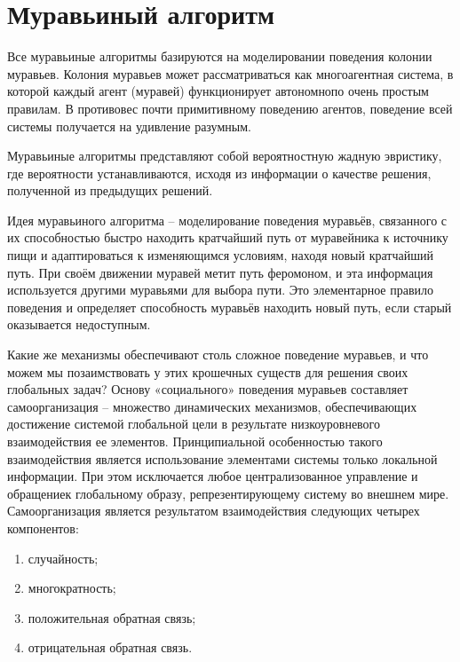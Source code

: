     \section{Муравьиный алгоритм}
        Все муравьиные алгоритмы базируются на моделировании поведения колонии муравьев.
        Колония муравьев может рассматриваться как многоагентная система,
        в которой каждый агент (муравей) функционирует автономнопо очень простым правилам.
        В противовес почти примитивному поведению агентов, 
        поведение всей системы получается на удивление разумным.
            
        Муравьиные алгоритмы представляют собой вероятностную жадную эвристику,
        где вероятности устанавливаются, 
        исходя из информации о качестве решения,
        полученной из предыдущих решений.
        
        Идея муравьиного алгоритма -- моделирование поведения муравьёв,
        связанного с их способностью быстро находить кратчайший путь от муравейника
        к источнику пищи и адаптироваться к изменяющимся условиям,
        находя новый кратчайший путь. 
        При своём движении муравей метит путь феромоном,
        и эта информация используется другими муравьями для выбора пути.
        Это элементарное правило поведения и определяет способность муравьёв 
        находить новый путь, если старый оказывается недоступным.
        
        Какие же механизмы обеспечивают столь сложное поведение муравьев,
        и что можем мы позаимствовать у этих крошечных существ для решения 
        своих глобальных задач? Основу «социального» поведения муравьев 
        составляет самоорганизация -- множество динамических механизмов,
        обеспечивающих достижение системой глобальной цели 
        в результате низкоуровневого взаимодействия ее элементов.
        Принципиальной особенностью такого взаимодействия является 
        использование элементами системы только локальной информации.
        При этом исключается любое централизованное управление и
        обращениек глобальному образу, репрезентирующему систему во внешнем мире.
        Самоорганизация является результатом взаимодействия 
        следующих четырех компонентов:
        \begin{enumerate}
            \item случайность;
            \item многократность;
            \item положительная обратная связь;
            \item отрицательная обратная связь.
        \end{enumerate}
        

